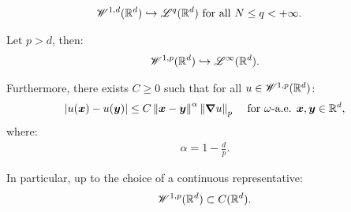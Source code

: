 \begin{corollary}
    \begin{align}
        \mathscr{W}^{1, d}(\mathbb{R}^{d}) \hookrightarrow \mathscr{L}^{q}(\mathbb{R}^{d}) &\text{ for all } N \leq q < +\infty.
    \end{align}
\end{corollary}

\begin{theorem}
    Let $p > d$, then:
    \begin{align}
        \mathscr{W}^{1, p}(\mathbb{R}^{d}) \hookrightarrow \mathscr{L}^{\infty}(\mathbb{R}^{d}).
    \end{align}

    Furthermore, there exists $C \geq 0$ such that for all $u \in \mathscr{W}^{1, p}(\mathbb{R}^{d})$:
    \begin{align}
        \left\lvert u(\bm{x}) - u(\bm{y}) \right\rvert &\leq C \left\lVert \bm{x} - \bm{y} \right\rVert^{\alpha} \left\lVert \bm{\nabla} u \right\rVert_p &\text{ for } \omega \text{-a.e. } \bm{x}, \bm{y} \in \mathbb{R}^{d},
    \end{align}
    where:
    \begin{align}
        \alpha = 1 - \frac{d}{p}.
    \end{align}

    In particular, up to the choice of a continuous representative:
    \begin{align}
        \mathscr{W}^{1, p}(\mathbb{R}^{d}) \subset C(\mathbb{R}^{d}).
    \end{align}
\end{theorem}

